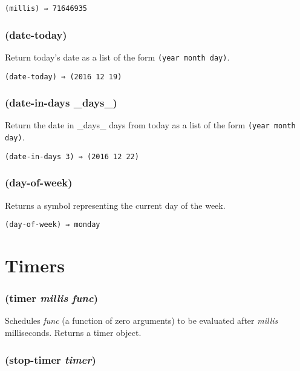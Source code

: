 \documentclass{article}
\begin{document}
\begin{verbatim}
(millis) ⇒ 71646935
\end{verbatim}

\subsubsection{(date-today)}
\label{sec:date-today}

Return today's date as a list of the form \verb|(year month day)|.

\begin{verbatim}
(date-today) ⇒ (2016 12 19)
\end{verbatim}

\subsubsection{(date-in-days _days_)}
\label{sec:date-in-days}

Return the date in _days_ days from today as a list of the form \verb|(year month day)|.

\begin{verbatim}
(date-in-days 3) ⇒ (2016 12 22)
\end{verbatim}

\subsubsection{(day-of-week)}
\label{sec:day-of-week}

Returns a symbol representing the current day of the week.

\begin{verbatim}
(day-of-week) ⇒ monday
\end{verbatim}

\section{Timers}\label{sec:timers}

\subsubsection{(timer \emph{millis} \emph{func})}

Schedules \emph{func} (a function of zero arguments) to be evaluated after \emph{millis}
milliseconds. Returns a timer object.

\subsubsection{(stop-timer \emph{timer})}
\end{document}
